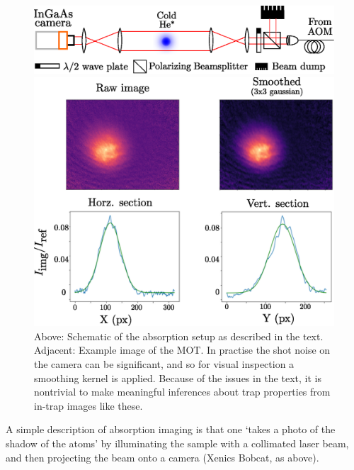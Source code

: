 	\begin{figure}
	\includegraphics[width=\textwidth]{fig/lattice/abs_img}
	\begin{minipage}{0.45\textwidth}
	\vspace{0pt}
		\caption{ Above: Schematic of the absorption setup as described in the text.
		Adjacent: 
		Example image of the MOT.
		In practise the shot noise on the camera can be significant, and so for visual inspection a smoothing kernel is applied.
		Because of the issues in the text, it is nontrivial to make meaningful inferences about trap properties from in-trap images like these.}
		\label{fig:abs_img}
		\end{minipage}
		\hfill
		\begin{minipage}{0.54\textwidth}
	    \vspace{0pt}
	    \includegraphics[width=\textwidth]{fig/lattice/20170606_CMOT_img}
	    \end{minipage}
	\end{figure}


	A simple description of absorption imaging is that one `takes a photo of the shadow of the atoms' by illuminating the sample with a collimated laser beam, and then projecting the beam onto a camera (Xenics Bobcat, as above).
	
